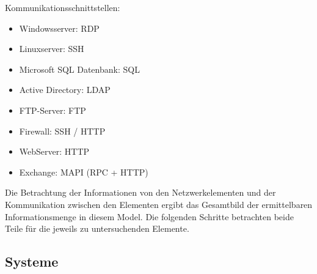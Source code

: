 Kommunikationsschnittstellen:
\begin{itemize}
\item Windowsserver: RDP
\item Linuxserver: SSH
\item Microsoft SQL Datenbank: SQL
\item Active Directory: LDAP
\item FTP-Server: FTP
\item Firewall: SSH / HTTP
\item WebServer: HTTP
\item Exchange: MAPI (RPC + HTTP)
\end{itemize}

Die Betrachtung der Informationen von den Netzwerkelementen und der Kommunikation zwischen den Elementen ergibt das Gesamtbild der ermittelbaren Informationsmenge in diesem Model. Die folgenden Schritte betrachten beide Teile für die jeweils zu untersuchenden Elemente.

\subsection{Systeme}





